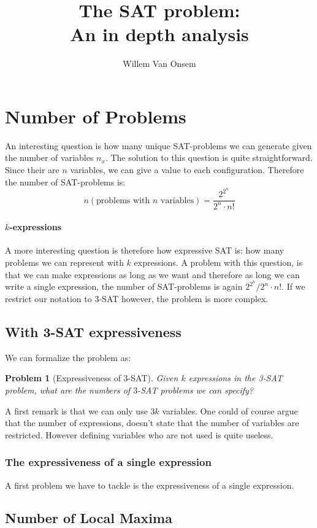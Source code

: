 \documentclass{article}
\title{The SAT problem:\\An in depth analysis}
\author{Willem Van Onsem}
\begin{document}
\maketitle
\tableofcontents
\newtheorem{problem}{Problem}
\newtheorem{definition}{Definition}
\section{Number of Problems}
An interesting question is how many unique SAT-problems we can generate given the number of variables $n_x$. The solution to this question is quite straightforward. Since their are $n$ variables, we can give a value to each configuration. Therefore the number of SAT-problems is:
\begin{equation}
n\left(\mbox{problems with $n$ variables}\right)=\displaystyle\frac{2^{2^n}}{2^n\cdot n!}
\end{equation}
\paragraph{$k$-expressions}
A more interesting question is therefore how expressive SAT is: how many problems we can represent with $k$ expressions. A problem with this question, is that we can make expressions as long as we want and therefore as long we can write a single expression, the number of SAT-problems is again $2^{2^n}/2^n\cdot n!$. If we restrict our notation to $3$-SAT however, the problem is more complex.
\subsection{With 3-SAT expressiveness}
We can formalize the problem as:
\begin{problem}[Expressiveness of 3-SAT]
Given $k$ expressions in the 3-SAT problem, what are the numbers of $3$-SAT problems we can specify?
\end{problem}
A first remark is that we can only use $3k$ variables. One could of course argue that the number of expressions, doesn't state that the number of variables are restricted. However defining variables who are not used is quite useless.
\subsubsection{The expressiveness of a single expression}
A first problem we have to tackle is the expressiveness of a single expression.
\subsection{Number of Local Maxima}
\end{document}
